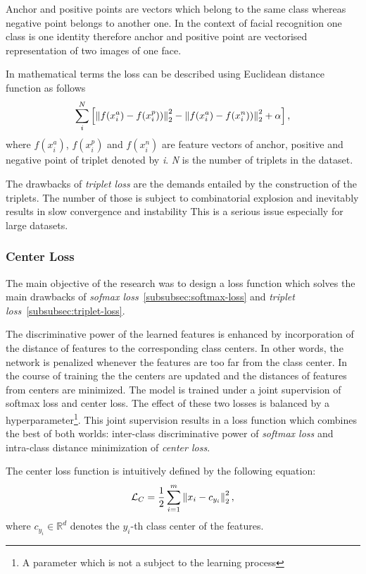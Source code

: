 Anchor and positive points are vectors which belong to the same class whereas negative point belongs to another one.
In the context of facial recognition one class is one identity therefore anchor and positive point are vectorised
representation of two images of one face.

In mathematical terms the loss can be described using Euclidean distance function as follows
\begin{equation}
    \sum_{i}^{N} \left[ \left\lVert f(x_{i}^{a}) - f(x_{i}^{p}))\right\rVert^2_2
    - \left\lVert f(x_{i}^{a}) - f(x_{i}^{n}))\right\rVert^2_2 + \alpha \right],
\end{equation}
where $f(x_{i}^{a})$, $f(x_{i}^{p})$ and $f(x_{i}^{n})$ are feature vectors of anchor, positive and
negative point of triplet denoted by \textit{i}.
\textit{N} is the number of triplets in the dataset.

The drawbacks of \textit{triplet loss} are the demands entailed by the construction of the triplets.
The number of those is subject to combinatorial explosion and inevitably results in slow convergence and instability
This is a serious issue especially for large datasets.

\subsubsection{Center Loss}
The main objective of the research was to design a loss function which solves the main drawbacks of
\textit{sofmax loss}~\ref{subsubsec:softmax-loss} and \textit{triplet loss}~\ref{subsubsec:triplet-loss}.

The discriminative power of the learned features is enhanced by incorporation of the distance of features to the
corresponding class centers.
In other words, the network is penalized whenever the features are too far from the class center.
In the course of training the the centers are updated and the distances of features from centers are minimized.
The model is trained under a joint supervision of softmax loss and center loss.
The effect of these two losses is balanced by a hyperparameter\footnote{A parameter which is not a subject to the
learning process}.
This joint supervision results in a loss function which combines the best of both worlds:
inter-class discriminative power of \textit{softmax loss} and intra-class distance minimization of \textit{center loss}.

The center loss function is intuitively defined by the following equation:
\begin{equation}
    \label{eq:center}
    \mathcal{L}_C = \frac{1}{2} \sum_{i=1}^{m} \left\lVert x_i - c_{y_i}\right\rVert_2^2,
\end{equation}
where $c_{y_i} \in \mathbb{R}^{d}$ denotes the $y_i$-th class center of the features.

